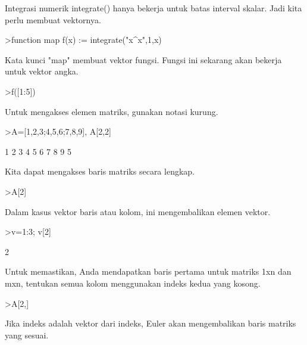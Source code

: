\documentclass[a4paper,10pt]{article}
\begin{document}
\begin{eulernotebook}
\begin{eulercomment}
\begin{eulercomment}
\begin{eulercomment}
\begin{eulercomment}
\begin{eulercomment}
\begin{eulercomment}
\begin{eulercomment}
Integrasi numerik integrate() hanya bekerja untuk batas interval
skalar. Jadi kita perlu membuat vektornya.
\end{eulercomment}
\begin{eulerprompt}
>function map f(x) := integrate("x^x",1,x)
\end{eulerprompt}
\begin{eulercomment}
Kata kunci "map" membuat vektor fungsi. Fungsi ini sekarang akan
bekerja\\
untuk vektor angka.
\end{eulercomment}
\begin{eulerprompt}
>f([1:5])
\end{eulerprompt}
\begin{euleroutput}
  [0,  2.05045,  13.7251,  113.336,  1241.03]
\end{euleroutput}
\begin{eulercomment}
Untuk mengakses elemen matriks, gunakan notasi kurung.
\end{eulercomment}
\begin{eulerprompt}
>A=[1,2,3;4,5,6;7,8,9], A[2,2]
\end{eulerprompt}
\begin{euleroutput}
              1             2             3 
              4             5             6 
              7             8             9 
  5
\end{euleroutput}
\begin{eulercomment}
Kita dapat mengakses baris matriks secara lengkap.
\end{eulercomment}
\begin{eulerprompt}
>A[2]
\end{eulerprompt}
\begin{euleroutput}
  [4,  5,  6]
\end{euleroutput}
\begin{eulercomment}
Dalam kasus vektor baris atau kolom, ini mengembalikan elemen vektor.
\end{eulercomment}
\begin{eulerprompt}
>v=1:3; v[2]
\end{eulerprompt}
\begin{euleroutput}
  2
\end{euleroutput}
\begin{eulercomment}
Untuk memastikan, Anda mendapatkan baris pertama untuk matriks 1xn dan
mxn, tentukan semua kolom menggunakan indeks kedua yang kosong.
\end{eulercomment}
\begin{eulerprompt}
>A[2,]
\end{eulerprompt}
\begin{euleroutput}
  [4,  5,  6]
\end{euleroutput}
\begin{eulercomment}
Jika indeks adalah vektor dari indeks, Euler akan mengembalikan baris
matriks yang sesuai.


\end{eulercomment}
\end{eulercomment}
\end{eulercomment}
\end{eulercomment}
\end{eulercomment}
\end{eulercomment}
\end{eulercomment}
\end{eulernotebook}
\end{document}
